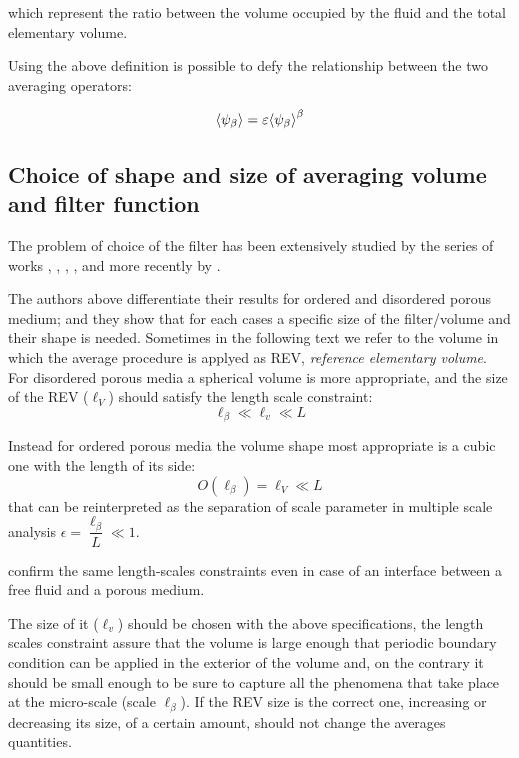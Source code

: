 which represent the ratio between the volume occupied by the fluid and the total elementary volume.

Using the above definition is possible to defy the relationship between the two averaging operators:

\begin{equation}
	{\left< \psi_{\beta} \right>} =  \varepsilon {\left< \psi_{\beta} \right>}^{\beta}
	\label{eq:means_vs_meani}
\end{equation}

\subsection{Choice of shape and size of averaging volume and filter function}
\label{ch:filter}

The problem of choice of the filter has been extensively studied by the series of works \citet{quintard1994transport1}, \citet{quintard1994transport2}, \citet{quintard1994transport3}, \citet{quintard1994transport4}, \citet{quintard1994transport5} and more recently by \citet{davit2017technical}.

The authors above differentiate their results for ordered and disordered porous medium; and they show that for each cases a specific size of the filter/volume and their shape is needed.
Sometimes in the following text we refer to the volume in which the average procedure is applyed as REV, \textit{reference elementary volume}.
For disordered porous media a spherical volume is more appropriate, and the size of the REV ($\ell_V$) should satisfy the length scale constraint:
$$
\ell_{\beta} \ll \ell_v \ll L
$$

Instead for ordered porous media the volume shape most appropriate is a cubic one with the length of its side:
$$
O(\ell_{\beta}) = \ell_V \ll L
$$
that can be reinterpreted as the separation of scale parameter in multiple scale analysis $\epsilon = \dfrac{\ell_{\beta}}{L} \ll 1$.

\citet{ochoa1995momentum} confirm the same length-scales constraints even in case of an interface between a free fluid and a porous medium.


The size of it ($\ell_v$) should be chosen with the above specifications, the length scales constraint assure that the volume is large enough that periodic boundary condition can be applied in the exterior of the volume and, on the contrary it should be small enough to be sure to capture all the phenomena that take place at the micro-scale (scale $\ell_{\beta}$).
If the REV size is the correct one, increasing or decreasing its size, of a certain amount, should not change the averages quantities.

